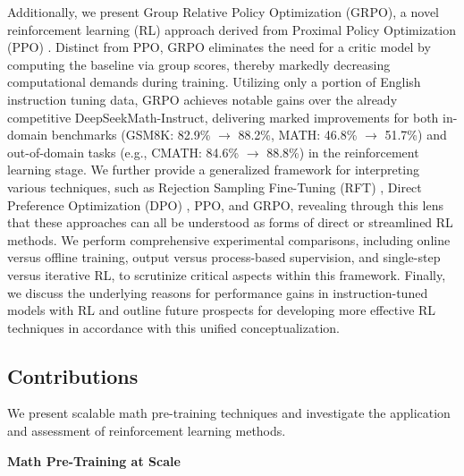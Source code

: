 Additionally, we present Group Relative Policy Optimization (GRPO), a novel reinforcement learning (RL) approach derived from Proximal Policy Optimization (PPO) \citep{schulman2017proximal}. Distinct from PPO, GRPO eliminates the need for a critic model by computing the baseline via group scores, thereby markedly decreasing computational demands during training. Utilizing only a portion of English instruction tuning data, GRPO achieves notable gains over the already competitive DeepSeekMath-Instruct, delivering marked improvements for both in-domain benchmarks (GSM8K: 82.9\% $\rightarrow$ 88.2\%, MATH: 46.8\% $\rightarrow$ 51.7\%) and out-of-domain tasks (e.g., CMATH: 84.6\% $\rightarrow$ 88.8\%) in the reinforcement learning stage. We further provide a generalized framework for interpreting various techniques, such as Rejection Sampling Fine-Tuning (RFT) \citep{yuan2023scaling}, Direct Preference Optimization (DPO) \citep{dpo}, PPO, and GRPO, revealing through this lens that these approaches can all be understood as forms of direct or streamlined RL methods. We perform comprehensive experimental comparisons, including online versus offline training, output versus process-based supervision, and single-step versus iterative RL, to scrutinize critical aspects within this framework. Finally, we discuss the underlying reasons for performance gains in instruction-tuned models with RL and outline future prospects for developing more effective RL techniques in accordance with this unified conceptualization.

\subsection{Contributions}
We present scalable math pre-training techniques and investigate the application and assessment of reinforcement learning methods.

\textbf{Math Pre-Training at Scale}

